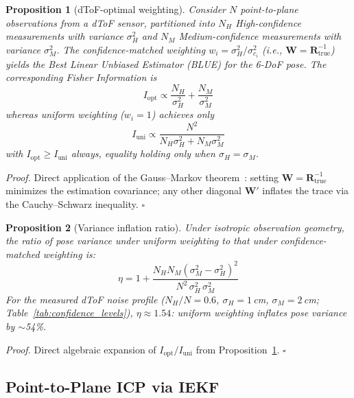 \documentclass[journal]{IEEEtran}
\newtheorem{proposition}{Proposition}
\begin{document}
\begin{proposition}[dToF-optimal weighting]
\label{prop:fim}
Consider $N$ point-to-plane observations from a dToF sensor, partitioned into $N_H$ High-confidence measurements with variance $\sigma_H^2$ and $N_M$ Medium-confidence measurements with variance $\sigma_M^2$. The confidence-matched weighting $w_i = \sigma_H^2 / \sigma_{c_i}^2$ (i.e., $\mathbf{W} = \mathbf{R}_{\text{true}}^{-1}$) yields the Best Linear Unbiased Estimator (BLUE) for the 6-DoF pose. The corresponding Fisher Information is
\begin{equation}
    I_{\text{opt}} \propto \frac{N_H}{\sigma_H^2} + \frac{N_M}{\sigma_M^2}
    \label{eq:fim_opt}
\end{equation}
whereas uniform weighting ($w_i = 1$) achieves only
\begin{equation}
    I_{\text{uni}} \propto \frac{N^2}{N_H \sigma_H^2 + N_M \sigma_M^2}
    \label{eq:fim_uni}
\end{equation}
with $I_{\text{opt}} \geq I_{\text{uni}}$ always, equality holding only when $\sigma_H = \sigma_M$.
\end{proposition}

\textit{Proof.} Direct application of the Gauss--Markov theorem~\cite{barfoot2017state}: setting $\mathbf{W} = \mathbf{R}_{\text{true}}^{-1}$ minimizes the estimation covariance; any other diagonal $\mathbf{W}'$ inflates the trace via the Cauchy--Schwarz inequality. \hfill$\square$

\begin{proposition}[Variance inflation ratio]
\label{prop:efficiency}
Under isotropic observation geometry, the ratio of pose variance under uniform weighting to that under confidence-matched weighting is:
\begin{equation}
    \eta = 1 + \frac{N_H N_M (\sigma_M^2 - \sigma_H^2)^2}{N^2\,\sigma_H^2\,\sigma_M^2}
    \label{eq:efficiency}
\end{equation}
For the measured dToF noise profile ($N_H/N = 0.6$, $\sigma_H = 1$\,cm, $\sigma_M = 2$\,cm; Table~\ref{tab:confidence_levels}), $\eta \approx 1.54$: uniform weighting inflates pose variance by ${\sim}$54\%.
\end{proposition}

\textit{Proof.} Direct algebraic expansion of $I_{\text{opt}} / I_{\text{uni}}$ from Proposition~\ref{prop:fim}. \hfill$\square$

\subsection{Point-to-Plane ICP via IEKF}
\label{sec:icp}
\end{document}
